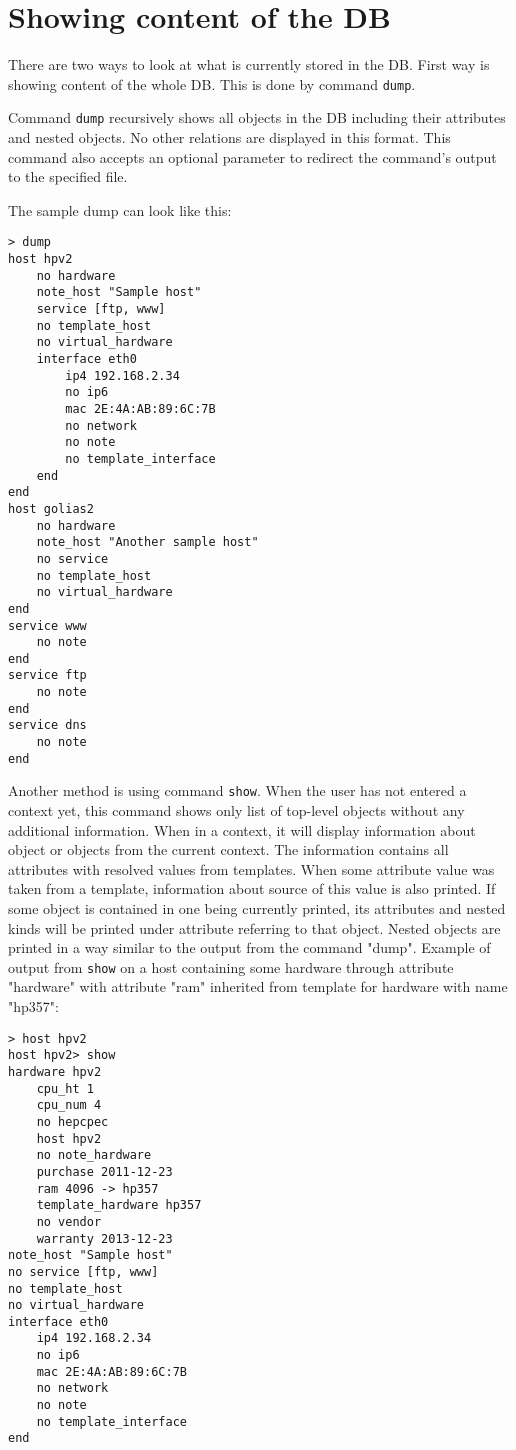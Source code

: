\documentclass[deska]{subfiles}
\begin{document}
\section{Showing content of the DB}

There are two ways to look at what is currently stored in the DB. First way is showing content of the whole DB. This
is done by command {\tt dump}.

Command {\tt dump} recursively shows all objects in the DB including their attributes and nested objects. No other
relations are displayed in this format. This command also accepts an optional parameter to redirect the command's output
to the specified file.

The sample dump can look like this:
\begin{verbatim}
> dump
host hpv2
    no hardware
    note_host "Sample host"
    service [ftp, www]
    no template_host
    no virtual_hardware
    interface eth0
        ip4 192.168.2.34
        no ip6
        mac 2E:4A:AB:89:6C:7B
        no network
        no note
        no template_interface
    end
end
host golias2
    no hardware
    note_host "Another sample host"
    no service
    no template_host
    no virtual_hardware
end
service www
    no note
end
service ftp
    no note
end
service dns
    no note
end
\end{verbatim}

Another method is using command {\tt show}. When the user has not entered a context yet, this command shows only list of top-level objects without any
additional information. When in a context, it will display information about object or objects from the current context. The
information contains all attributes with resolved values from templates. When some attribute value was taken from
a template, information about source of this value is also printed. If some object is contained in one being currently
printed, its attributes and nested kinds will be printed under attribute referring to that object. Nested objects are
printed in a way similar to the output from the command "dump". Example of output from {\tt show} on a host containing some hardware
through attribute "hardware" with attribute "ram" inherited from template for hardware with name "hp357":

\begin{verbatim}
> host hpv2
host hpv2> show
hardware hpv2
    cpu_ht 1
    cpu_num 4
    no hepcpec
    host hpv2
    no note_hardware
    purchase 2011-12-23
    ram 4096 -> hp357
    template_hardware hp357
    no vendor
    warranty 2013-12-23
note_host "Sample host"
no service [ftp, www]
no template_host
no virtual_hardware
interface eth0
    ip4 192.168.2.34
    no ip6
    mac 2E:4A:AB:89:6C:7B
    no network
    no note
    no template_interface
end
\end{verbatim}
\end{document}
